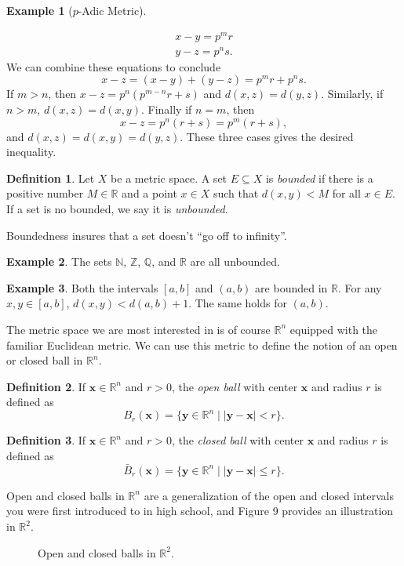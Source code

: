 \documentclass{article}
\newcommand{\N}{\mathbb{N}}
\newcommand{\R}{\mathbb{R}}
\newcommand{\Q}{\mathbb{Q}}
\newcommand{\x}{\mathbf{x}}
\newcommand{\y}{\mathbf{y}}
\newcommand{\Z}{\mathbb{Z}}
\theoremstyle{definition}
\newtheorem{definition}{Definition}[section]
\newtheorem{example}{Example}[section]
\begin{document}
\begin{example}[$ p $-Adic Metric]
\begin{enumerate}
\begin{align*}
	x-y=p^mr\\y-z=p^ns.
\end{align*}
We can combine these equations to conclude $$x-z=(x-y)+(y-z)=p^mr+p^ns. $$ If $ m>n $, then $ x-z=p^n(p^{m-n}r+s)$ and $ d(x,z)=d(y,z) $. Similarly, if $ n>m $, $ d(x,z)=d(x,y) $. Finally if $ n=m $, then $$x-z=p^n(r+s)=p^m(r+s), $$ and $ d(x,z)=d(x,y)=d(y,z) $. These three cases gives the desired inequality. 
\end{enumerate}
\end{example}
\begin{definition}
	Let $ X $ be a metric space. A set $ E\subseteq X $ is \textit{\color{red} bounded} if there is a positive number $ M\in\R $ and a point $ x\in X $ such that $ d(x,y)<M $ for all $ x\in E $. If a set is no bounded, we say it is \textit{\color{red}unbounded}. 
\end{definition}
Boundedness insures that a set doesn't ``go off to infinity''. 
\begin{example}
	The sets $ \N $, $ \Z $, $ \Q $, and $ \R $ are all unbounded. 
\end{example}
\begin{example}
Both the intervals $ [a,b] $ and $ (a,b) $ are bounded in $ \R $. For any $ x,y\in[a,b] $, $ d(x,y)<d(a,b)+1 $. The same holds for $ (a,b) $. 
\end{example}
The metric space we are most interested in is of course $ \R^n $ equipped with the familiar Euclidean metric. We can use this metric to define the notion of an open or closed ball in $ \R^n $. 
\begin{definition}
	If $ \x\in\R^n $ and $ r>0 $, the \textit{\color{red} open ball} with center $ \x $ and radius $ r $ is defined as $$ B_r(\x)=\{\y\in\R^n\mid|\y-\x|<r\}. $$ 
\end{definition} 
\begin{definition}
	If $ \x\in\R^n $ and $ r>0 $, the \textit{\color{red} closed ball} with center $ \x $ and radius $ r $ is defined as $$ \bar{B}_r(\x)=\{\y\in\R^n\mid|\y-\x|\le r\}. $$ 
\end{definition}
Open and closed balls in $ \R^n $ are a generalization of the open and closed intervals you were first introduced to in high school, and Figure 9 provides an illustration in $ \R^2 $. 
\begin{figure}[h!]
	\centering
	\caption{Open and closed balls in $ \R^2 $.}
\end{figure}  
\end{document}
